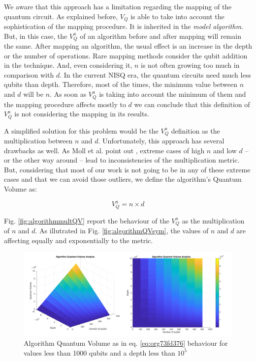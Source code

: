 \begin{itemize}
\begin{itemize}
\begin{itemize}
We aware that this approach has a limitation regarding the mapping of the quantum circuit.
As explained before, \(V_Q\) is able to take into account the sophistication of the mapping procedure.
It is inherited in the \emph{model algorithm}.
But, in this case, the \(V^a_Q\) of an algorithm before and after mapping will remain the same.
After mapping an algorithm, the usual effect is an increase in the depth or the number of operations.
Rare mapping methods consider the qubit addition in the technique.
And, even considering it, \(n\) is not often growing too much in comparison with \(d\).
In the current NISQ era, the quantum circuits need much less qubits than depth.
Therefore, most of the times, the minimum value between \(n\) and \(d\) will be \(n\).
As soon as \(V^a_Q\) is taking into account the minimum of them and the mapping procedure affects mostly to \(d\) we can conclude that this definition of \(V^a_Q\) is not considering the mapping in its results.

A simplified solution for this problem would be the \(V^a_Q\) definition as the multiplication between \(n\) and \(d\).
Unfortunately, this approach has several drawbacks as well.
As Moll et al. point out \cite{Moll_2018}, extreme cases of high \(n\) and low \(d\) -- or the other way around -- lead to inconsistencies of the multiplication metric.
But, considering that most of our work is not going to be in any of these extreme cases and that we can avoid those outliers, we define the algorithm's Quantum Volume as:

\begin{equation}
\label{eq:org73fd376}
V_Q^a =  n \times d
\end{equation}

Fig. \ref{fig:algorithmmultQV} report the behaviour of the \(V_Q^a\) as
the multiplication of \(n\) and \(d\).
As illutrated in Fig. \ref{fig:algorithmQVsym}, the values of \(n\) and \(d\) are
affecting equally and exponentially to the metric.

\begin{figure}[htbp]
\centering
\includegraphics[width=\textwidth]{figures/V_q_analysis_mult.png}
\caption{\label{fig:org205c4bb}
Algorithm Quantum Volume as in eq. \ref{eq:org73fd376} behaviour for values less than 1000 qubits and a depth less than \(10^{5}\)}
\end{figure}


\end{itemize}
\end{itemize}
\end{itemize}
